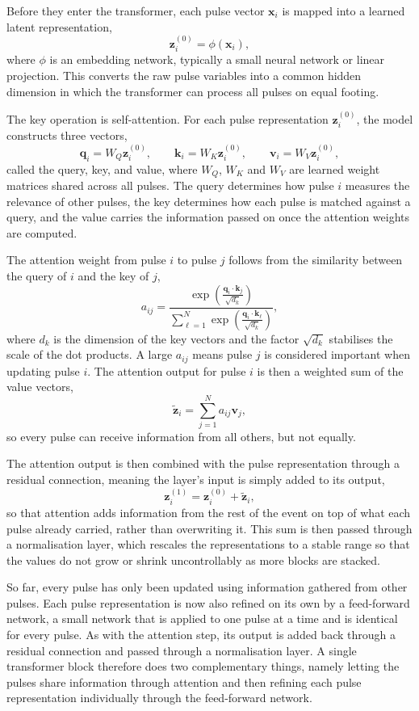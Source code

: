Before they enter the transformer, each pulse vector $\mathbf{x}_i$ is mapped into a learned latent representation,
\[
    \mathbf{z}_i^{(0)}
    =
    \phi(\mathbf{x}_i),
\]
where \(\phi\) is an embedding network, typically a small neural network or linear projection. This converts the raw pulse variables into a common hidden dimension in which the transformer can process all pulses on equal footing.

The key operation is self-attention. For each pulse representation \(\mathbf{z}_i^{(0)}\), the model constructs three vectors,
\[
    \mathbf{q}_i = W_Q \mathbf{z}_i^{(0)},
    \qquad
    \mathbf{k}_i = W_K \mathbf{z}_i^{(0)},
    \qquad
    \mathbf{v}_i = W_V \mathbf{z}_i^{(0)},
\]
called the query, key, and value, where \(W_Q\), \(W_K\) and \(W_V\) are learned weight matrices shared across all pulses. The query determines how pulse \(i\) measures the relevance of other pulses, the key determines how each pulse is matched against a query, and the value carries the information passed on once the attention weights are computed.

The attention weight from pulse \(i\) to pulse \(j\) follows from the similarity between the query of \(i\) and the key of \(j\),
\[
    a_{ij}
    =
    \frac{
    \exp\left(
    \frac{\mathbf{q}_i \cdot \mathbf{k}_j}{\sqrt{d_k}}
    \right)
    }{
    \sum_{\ell=1}^{N}
    \exp\left(
    \frac{\mathbf{q}_i \cdot \mathbf{k}_{\ell}}{\sqrt{d_k}}
    \right)
    },
\]
where \(d_k\) is the dimension of the key vectors and the factor \(\sqrt{d_k}\) stabilises the scale of the dot products. A large \(a_{ij}\) means pulse \(j\) is considered important when updating pulse \(i\). The attention output for pulse \(i\) is then a weighted sum of the value vectors,
\[
    \widetilde{\mathbf{z}}_i
    =
    \sum_{j=1}^{N}
    a_{ij}\mathbf{v}_j,
\]
so every pulse can receive information from all others, but not equally.

The attention output is then combined with the pulse representation through a residual connection, meaning the layer's input is simply added to its output,
\[
    \mathbf{z}_i^{(1)}
    =
    \mathbf{z}_i^{(0)}
    +
    \widetilde{\mathbf{z}}_i,
\]
so that attention adds information from the rest of the event on top of what each pulse already carried, rather than overwriting it. This sum is then passed through a normalisation layer, which rescales the representations to a stable range so that the values do not grow or shrink uncontrollably as more blocks are stacked.

So far, every pulse has only been updated using information gathered from other pulses. Each pulse representation is now also refined on its own by a feed-forward network, a small network that is applied to one pulse at a time and is identical for every pulse. As with the attention step, its output is added back through a residual connection and passed through a normalisation layer. A single transformer block therefore does two complementary things, namely letting the pulses share information through attention and then refining each pulse representation individually through the feed-forward network.

